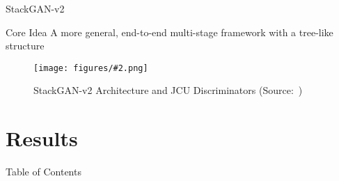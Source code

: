 \documentclass{beamer}
\newcommand{\paperfigure}[3][width=\textwidth]{%
    \begin{figure}%
        \centering%
        \texttt{[image: figures/\#2.png]}%
        \caption{#3 (Source:~\cite{stackgan++})}%
    \end{figure}%
}
\begin{document}
\begin{frame}{StackGAN-v2}
    \centering
    \begin{minipage}{0.8\textwidth}
        \begin{block}{Core Idea}
            \centering
            A more general, end-to-end multi-stage framework with a tree-like structure
        \end{block}
    \end{minipage}
    \paperfigure[width=0.9\textwidth]{stackgan_v2}{StackGAN-v2 Architecture and JCU Discriminators}
\end{frame}


\section{Results}
\begin{frame}{Table of Contents}
    \tableofcontents[currentsection]
\end{frame}
\end{document}
